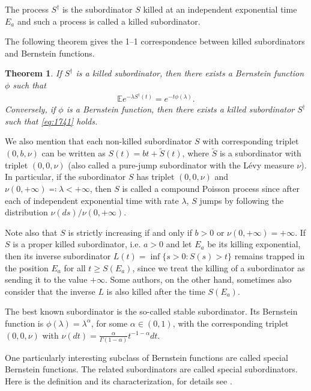 \documentclass[reqno]{amsart}
\newtheorem{theorem}{Theorem}[section] %
\theoremstyle{remark}
\numberwithin{equation}{section} %
\newcommand{\EE}{\mathds{E}}
\newcommand{\wt}{\widetilde}
\newcommand{\1}{\mathds{1}}
\begin{document}
	The process $S^\dagger$ is the subordinator $S$ killed at an independent exponential time $E_a$ and such a process is called a  {killed subordinator}.
	
	The following theorem gives the 1--1 correspondence between killed subordinators and Bernstein functions.
	
	\begin{theorem}
		If $S^\dagger$ is a killed subordinator, then there exists a Bernstein function $\phi$ such that
		\begin{align}\label{eq:1741}
			\EE e^{-\lambda S^\dagger(t)}=e^{-t \phi(\lambda)}.
		\end{align}
		Conversely, if $\phi$ is a Bernstein function, then there exists a killed subordinator $S^\dagger$ such that \eqref{eq:1741} holds.
	\end{theorem}
	
	We also mention that each non-killed subordinator $S$ with corresponding triplet $(0,b,\nu)$ can be written as $S(t)=bt+\wt S(t)$, where $\wt S$ is a subordinator with  triplet $(0,0,\nu)$ (also called a pure-jump subordinator with the L\'evy measure $\nu$). In particular, if the subordinator $S$ has  triplet $(0,0,\nu)$ and $\nu(0,+\infty)\eqqcolon\lambda<+\infty$, then $S$ is called a compound Poisson process since after each of independent exponential time with rate $\lambda$, $S$ jumps by following the distribution $\nu(ds)/\nu(0,+\infty)$.
	
	Note also that $S$ is strictly increasing if and only if $b>0$ or $\nu(0,+\infty)=+\infty$. If $S$ is a proper killed subordinator, i.e. $a>0$ and let $E_a$ be its killing exponential, then its inverse subordinator $L(t)=\inf\{s>0:S(s)>t\}$ remains trapped in the position $E_a$ for all $t\ge S(E_a)$, since we treat the killing of a subordinator as sending it to the value $+\infty$. Some authors, on the other hand, sometimes also consider that the inverse $L$ is also killed after the time $S(E_a)$.
	
	
	The best known subordinator is the so-called stable subordinator. Its Bernstein function is $\phi(\lambda)=\lambda^{\alpha}$, for some $\alpha\in (0,1)$, with the corresponding triplet $(0,0,\nu)$ with $\nu(dt)=\frac{\alpha}{\Gamma(1-\alpha)}t^{-1-\alpha}dt$.
	
	One particularly interesting subclass of Bernstein functions are called special Bernstein functions. The related subordinators are called special subordinators. Here is the definition and its characterization, for details see \cite[Chapter 13]{bernstein}.
	
\end{document}
